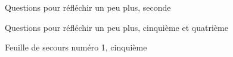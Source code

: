 \begin{feuilleExo}{Questions pour réfléchir un peu plus, seconde}
\end{feuilleExo}

\begin{feuilleExo}{Questions pour réfléchir un peu plus, cinquième et quatrième}
\end{feuilleExo}

\begin{feuilleExo}{Feuille de secours numéro 1, cinquième}
    \begin{multicols}{2}
    \end{multicols}
\end{feuilleExo}

